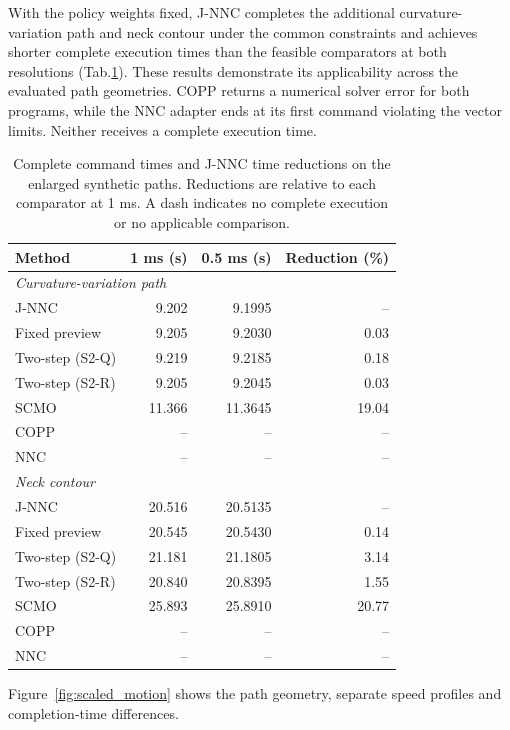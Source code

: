 \documentclass[preprint,12pt]{elsarticle}
\begin{document}
With the policy weights fixed, J-NNC completes the additional curvature-variation path and neck contour under the common constraints and achieves shorter complete execution times than the feasible comparators at both resolutions (Tab.\nobreakspace\ref{tab:representative_comparison}). These results demonstrate its applicability across the evaluated path geometries. COPP returns a numerical solver error for both programs, while the NNC adapter ends at its first command violating the vector limits. Neither receives a complete execution time.

\begin{table}[htbp]
\centering\small
\caption{Complete command times and J-NNC time reductions on the enlarged synthetic paths. Reductions are relative to each comparator at 1 ms. A dash indicates no complete execution or no applicable comparison.}
\label{tab:representative_comparison}
\begin{tabular}{lrrr}
\toprule
Method & 1 ms (s) & 0.5 ms (s) & Reduction (\%) \\
\midrule
\multicolumn{4}{l}{\textit{Curvature-variation path}} \\
\addlinespace[2pt]
J-NNC & 9.202 & 9.1995 & -- \\
Fixed preview & 9.205 & 9.2030 & 0.03 \\
Two-step (S2-Q) & 9.219 & 9.2185 & 0.18 \\
Two-step (S2-R) & 9.205 & 9.2045 & 0.03 \\
SCMO & 11.366 & 11.3645 & 19.04 \\
COPP & -- & -- & -- \\
NNC & -- & -- & -- \\
\midrule
\multicolumn{4}{l}{\textit{Neck contour}} \\
\addlinespace[2pt]
J-NNC & 20.516 & 20.5135 & -- \\
Fixed preview & 20.545 & 20.5430 & 0.14 \\
Two-step (S2-Q) & 21.181 & 21.1805 & 3.14 \\
Two-step (S2-R) & 20.840 & 20.8395 & 1.55 \\
SCMO & 25.893 & 25.8910 & 20.77 \\
COPP & -- & -- & -- \\
NNC & -- & -- & -- \\
\bottomrule
\end{tabular}
\end{table}

Figure~\ref{fig:scaled_motion} shows the path geometry, separate speed profiles and completion-time differences.
\end{document}
